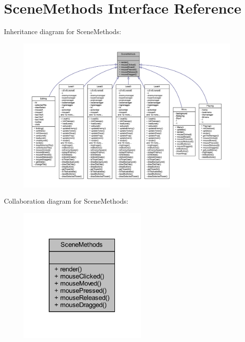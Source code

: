 \hypertarget{interfacescenes_1_1_scene_methods}{}\section{Scene\+Methods Interface Reference}
\label{interfacescenes_1_1_scene_methods}


Inheritance diagram for Scene\+Methods\+:
\nopagebreak
\begin{figure}[H]
\begin{center}
\leavevmode
\includegraphics[width=350pt]{interfacescenes_1_1_scene_methods__inherit__graph}
\end{center}
\end{figure}


Collaboration diagram for Scene\+Methods\+:\nopagebreak
\begin{figure}[H]
\begin{center}
\leavevmode
\includegraphics[width=181pt]{interfacescenes_1_1_scene_methods__coll__graph}
\end{center}
\end{figure}
